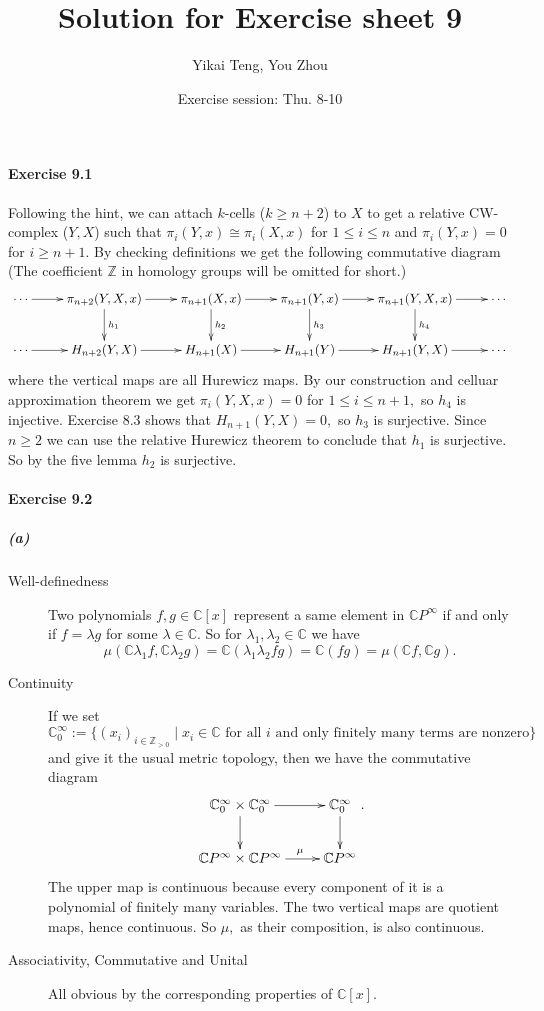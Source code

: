 \documentclass{article}
\title{Solution for Exercise sheet 9}
\author{Yikai Teng, You Zhou}
\date{Exercise session: Thu. 8-10}
\begin{document}
\maketitle
\paragraph{Exercise 9.1}
Following the hint, we can attach $k$-cells ($k\geq n+2$) to $X$ to get a relative CW-complex ($Y,X$) such that $\pi_i(Y,x)\cong\pi_i(X,x)$ for $1\leq i\leq n$ and $\pi_i(Y,x)=0$ for $i\geq n+1.$ By checking definitions we get the following commutative diagram (The coefficient $\mathbb{Z}$ in homology groups will be omitted for short.)
\[\xymatrix{
\cdots\ar[r] & \pi_{n+2}(Y,X,x)\ar[r]\ar[d]^{h_1} & \pi_{n+1}(X,x)\ar[r]\ar[d]^{h_2} & \pi_{n+1}(Y,x)\ar[r]\ar[d]^{h_3} & \pi_{n+1}(Y,X,x)\ar[r]\ar[d]^{h_4} & \cdots\\
\cdots\ar[r] & H_{n+2}(Y,X)\ar[r] & H_{n+1}(X)\ar[r] & H_{n+1}(Y)\ar[r] & H_{n+1}(Y,X)\ar[r] & \cdots}\]
where the vertical maps are all Hurewicz maps. By our construction and celluar approximation theorem we get $\pi_i(Y,X,x)=0$ for $1\leq i\leq n+1,$ so $h_4$ is injective. Exercise 8.3 shows that $H_{n+1}(Y,X)=0,$ so $h_3$ is surjective. Since $n\geq2$ we can use the relative Hurewicz theorem to conclude that $h_1$ is surjective. So by the five lemma $h_2$ is surjective.

\paragraph{Exercise 9.2}
\subparagraph{(a)}
\begin{description}
  \item[Well-definedness] Two polynomials $f,g\in\mathbb{C}[x]$ represent a same element in $\mathbb{C}P^{\infty}$ if and only if $f=\lambda g$ for some $\lambda\in\mathbb{C}.$ So for $\lambda_1,\lambda_2\in\mathbb{C}$ we have
      \[\mu(\mathbb{C}\lambda_1f,\mathbb{C}\lambda_2g)=\mathbb{C}(\lambda_1\lambda_2fg)=\mathbb{C}(fg)=\mu(\mathbb{C}f,\mathbb{C}g).\]
  \item[Continuity] If we set $\mathbb{C}_0^{\infty}:=\{(x_i)_{i\in\mathbb{Z}_{>0}}\mid x_i\in\mathbb{C} \text{ for all }i\text{ and only finitely many terms are nonzero}\}$ and give it the usual metric topology, then we have the commutative diagram
      \[\xymatrix{
      \mathbb{C}_0^{\infty}\times\mathbb{C}_0^{\infty}\ar[r]\ar[d] & \mathbb{C}_0^{\infty}\ar[d]\\
      \mathbb{C}P^{\infty}\times\mathbb{C}P^{\infty}\ar[r]^(.6){\mu} & \mathbb{C}P^{\infty}
      }.\]
      The upper map is continuous because every component of it is a polynomial of finitely many variables. The two vertical maps are quotient maps, hence continuous. So $\mu,$ as their composition, is also continuous.
  \item[Associativity, Commutative and Unital] All obvious by the corresponding properties of $\mathbb{C}[x].$
\end{description}
\end{document}
